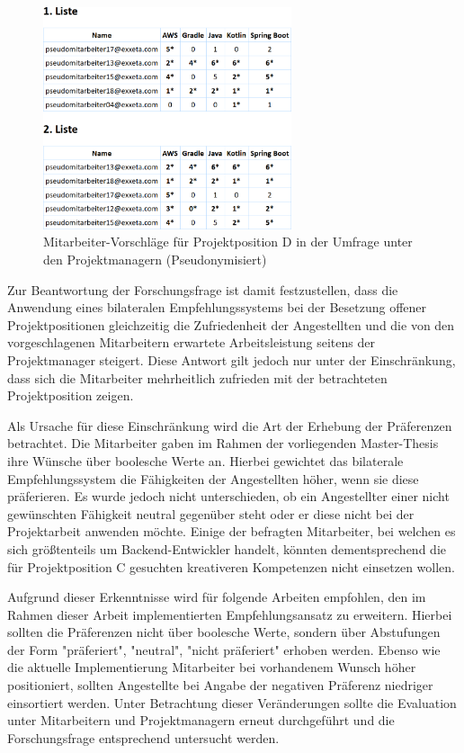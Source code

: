 \begin{figure}[h]
	\centering
	\includegraphics[width=0.65\textwidth]{gfx/projektposition-d.png}
	\caption{Mitarbeiter-Vorschläge für Projektposition D in der Umfrage unter den Projektmanagern (Pseudonymisiert)}
	\label{fig:diskussion:interpretation:abb2}
\end{figure}

Zur Beantwortung der Forschungsfrage ist damit festzustellen, dass die Anwendung eines bilateralen Empfehlungssystems bei der Besetzung offener Projektpositionen gleichzeitig die Zufriedenheit der Angestellten und die von den vorgeschlagenen Mitarbeitern erwartete Arbeitsleistung seitens der Projektmanager steigert. Diese Antwort gilt jedoch nur unter der Einschränkung, dass sich die Mitarbeiter mehrheitlich zufrieden mit der betrachteten Projektposition zeigen.

Als Ursache für diese Einschränkung wird die Art der Erhebung der Präferenzen betrachtet. Die Mitarbeiter gaben im Rahmen der vorliegenden Master-Thesis ihre Wünsche über boolesche Werte an. Hierbei gewichtet das bilaterale Empfehlungssystem die Fähigkeiten der Angestellten höher, wenn sie diese präferieren. Es wurde jedoch nicht unterschieden, ob ein Angestellter einer nicht gewünschten Fähigkeit neutral gegenüber steht oder er diese nicht bei der Projektarbeit anwenden möchte. Einige der befragten Mitarbeiter, bei welchen es sich größtenteils um Backend-Entwickler handelt, könnten dementsprechend die für Projektposition C gesuchten kreativeren Kompetenzen nicht einsetzen wollen.

Aufgrund dieser Erkenntnisse wird für folgende Arbeiten empfohlen, den im Rahmen dieser Arbeit implementierten Empfehlungsansatz zu erweitern. Hierbei sollten die Präferenzen nicht über boolesche Werte, sondern über Abstufungen der Form "präferiert", "neutral", "nicht präferiert" erhoben werden. Ebenso wie die aktuelle Implementierung Mitarbeiter bei vorhandenem Wunsch höher positioniert, sollten Angestellte bei Angabe der negativen Präferenz niedriger einsortiert werden. Unter Betrachtung dieser Veränderungen sollte die Evaluation unter Mitarbeitern und Projektmanagern erneut durchgeführt und die Forschungsfrage entsprechend untersucht werden.

